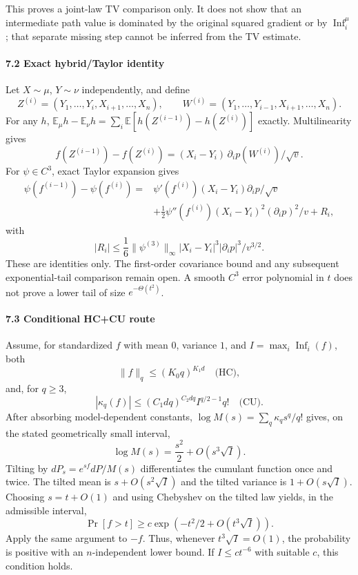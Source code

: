 This proves a joint-law TV comparison only. It does not show that an intermediate path value is dominated by the original squared gradient or by \(\operatorname{Inf}_i^\mu\); that separate missing step cannot be inferred from the TV estimate.

\paragraph{7.2 Exact hybrid/Taylor identity}\label{exact-hybridtaylor-identity}

Let \(X\sim\mu\), \(Y\sim\nu\) independently, and define
\[Z^{(i)}=(Y_1,\ldots,Y_i,X_{i+1},\ldots,X_n),\qquad
W^{(i)}=(Y_1,\ldots,Y_{i-1},X_{i+1},\ldots,X_n).\]
For any \(h\), \(\mathbb E_\mu h-\mathbb E_\nu h=\sum_i\mathbb E[h(Z^{(i-1)})-h(Z^{(i)})]\) exactly. Multilinearity gives
\[f(Z^{(i-1)})-f(Z^{(i)})
=(X_i-Y_i)\,\partial_ip(W^{(i)})/\sqrt v.\]
For \(\psi\in C^3\), exact Taylor expansion gives
\[\begin{aligned}
\psi(f^{(i-1)})-\psi(f^{(i)})
={}&\psi'(f^{(i)})(X_i-Y_i)\partial_ip/\sqrt v\\
&+\tfrac12\psi''(f^{(i)})(X_i-Y_i)^2(\partial_ip)^2/v+R_i,
\end{aligned}\]
with
\[|R_i|\le\frac16\|\psi^{(3)}\|_\infty
|X_i-Y_i|^3|\partial_ip|^3/v^{3/2}.\]
These are identities only. The first-order covariance bound and any subsequent exponential-tail comparison remain open. A smooth \(C^3\) error polynomial in \(t\) does not prove a lower tail of size \(e^{-\Theta(t^2)}\).

\paragraph{7.3 Conditional HC+CU route}\label{conditional-hccu-route}

Assume, for standardized \(f\) with mean \(0\), variance \(1\), and \(I=\max_i\operatorname{Inf}_i(f)\), both
\[\|f\|_q\le(K_0q)^{K_1d}\quad\text{(HC)},\]
and, for \(q\ge3\),
\[|\kappa_q(f)|\le(C_1dq)^{C_2dq}I^{q/2-1}q!\quad\text{(CU)}.\]
After absorbing model-dependent constants, \(\log M(s)=\sum_q\kappa_qs^q/q!\) gives, on the stated geometrically small interval,
\[\log M(s)=\frac{s^2}{2}+O(s^3\sqrt I).\]
Tilting by \(dP_s=e^{sf}dP/M(s)\) differentiates the cumulant function once and twice. The tilted mean is \(s+O(s^2\sqrt I)\) and the tilted variance is \(1+O(s\sqrt I)\). Choosing \(s=t+O(1)\) and using Chebyshev on the tilted law yields, in the admissible interval,
\[\Pr[f>t]\ge c\exp(-t^2/2+O(t^3\sqrt I)).\]
Apply the same argument to \(-f\). Thus, whenever \(t^3\sqrt I=O(1)\), the probability is positive with an \(n\)-independent lower bound. If \(I\le c t^{-6}\) with suitable \(c\), this condition holds.

